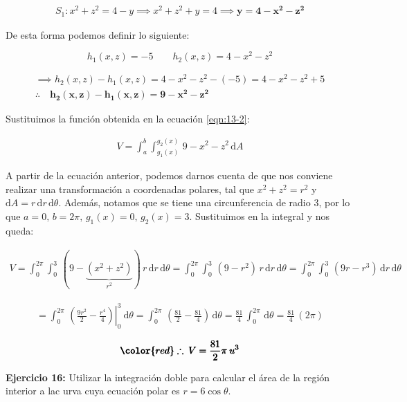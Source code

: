 \documentclass[12pt]{article}
\begin{document}
\begin{align*}
	S_1:x^2+z^2=4-y \implies x^2+z^2+y=4 \implies \boldsymbol{y=4-x^2-z^2}
\end{align*}

\noindent De esta forma podemos definir lo siguiente:

\begin{equation*}
	h_1(x,z) = -5 \qquad
	h_2(x,z) = 4-x^2-z^2
\end{equation*}

\begin{align*}
	\implies h_2(x,z) - h_1(x,z) = 4-x^2-z^2 - (-5) = 4-x^2-z^2 + 5\\
	\therefore \quad \boldsymbol{h_2(x,z) - h_1(x,z) = 9-x^2-z^2}
\end{align*}

\noindent Sustituimos la función obtenida en la ecuación \eqref{eqn:13-2}:

\begin{align*}
	V = \int_{a}^{b}\int_{g_1(x)}^{g_2(x)}\, 9-x^2-z^2\, \mathrm{d}A
\end{align*}

\noindent A partir de la ecuación anterior, podemos darnos cuenta de que nos conviene realizar una transformación a coordenadas polares, tal que $x^2+z^2 = r^2$ y $\mathrm{d}A = r\, \mathrm{d}r\,\mathrm{d}\theta
$. Además, notamos que se tiene una circunferencia de radio 3, por lo que $a=0,\, b=2\pi,\, g_1(x)=0,\, g_2(x)=3$. Sustituimos en la integral y nos queda:

\begin{align*}
	V = \int_{0}^{2\pi}\int_{0}^{3}\, (9-\underbrace{(x^2+z^2)}_{\text{$r^2$}})\, r\, \mathrm{d}r\,\mathrm{d}\theta = \int_{0}^{2\pi}\int_{0}^{3}\, (9-r^2)\, r\, \mathrm{d}r\,\mathrm{d}\theta = \int_{0}^{2\pi}\int_{0}^{3}\, (9r-r^3)\, \mathrm{d}r\,\mathrm{d}\theta
\end{align*}

\begin{align*}
	= \int_{0}^{2\pi}\, \left.\left(\frac{9r^2}{2}-\frac{r^4}{4}\right)\right|_0^3\ \mathrm{d}\theta = \int_{0}^{2\pi}\, \left(\frac{81}{2}-\frac{81}{4}\right)\,\mathrm{d}\theta = \frac{81}{4}\, \int_{0}^{2\pi}\, \mathrm{d}\theta = \frac{81}{4}\,(2\pi)
\end{align*}

\begin{align*}
	\pmb{\color{red} \therefore\: V = \frac{81}{2}\pi\: u^3}
\end{align*}

\noindent \textbf{Ejercicio 16:} Utilizar la integración doble para calcular el área de la región interior a lac urva cuya ecuación polar es $r=6\cos\theta$.
\end{document}
